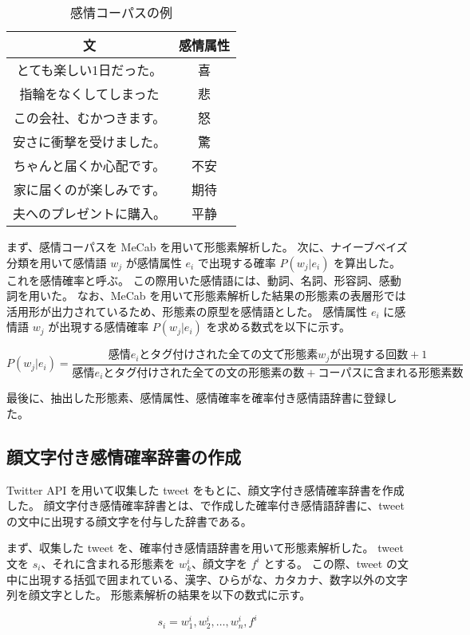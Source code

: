 \documentclass[11pt,a4j]{jsarticle}
\begin{document}
\begin{table}[htb]
  \caption{感情コーパスの例}
  \centering
  \begin{tabular}{c|c} \hline
    文 & 感情属性 \\ \hline \hline
    とても楽しい1日だった。 & 喜 \\
    指輪をなくしてしまった & 悲 \\
    この会社、むかつきます。 & 怒 \\ 
    安さに衝撃を受けました。 & 驚 \\
    ちゃんと届くか心配です。 & 不安 \\
    家に届くのが楽しみです。 & 期待 \\
    夫へのプレゼントに購入。& 平静 \\ \hline
  \end{tabular}
\end{table}

まず、感情コーパスを MeCab を用いて形態素解析した。
次に、ナイーブベイズ分類を用いて感情語 $w_j$ が感情属性 $e_i$ で出現する確率 $P(w_j|e_i)$ を算出した。
これを感情確率と呼ぶ。
この際用いた感情語には、動詞、名詞、形容詞、感動詞を用いた。
なお、MeCab を用いて形態素解析した結果の形態素の表層形では活用形が出力されているため、形態素の原型を感情語とした。
感情属性 $e_i$ に感情語 $w_j$ が出現する感情確率 $P(w_j|e_i)$ を求める数式を以下に示す。

\[
P(w_j|e_i)=\frac{感情 e_i とタグ付けされた全ての文で形態素 w_j が出現する回数 +1}{感情 e_i とタグ付けされた全ての文の形態素の数 + コーパスに含まれる形態素数}
\]

最後に、抽出した形態素、感情属性、感情確率を確率付き感情語辞書に登録した。

  \subsection{顔文字付き感情確率辞書の作成}\label{sec:kaomojidic}
Twitter API を用いて収集した tweet をもとに、顔文字付き感情確率辞書を作成した。
顔文字付き感情確率辞書とは、で作成した確率付き感情語辞書に、tweet の文中に出現する顔文字を付与した辞書である。

まず、収集した tweet を、確率付き感情語辞書を用いて形態素解析した。
tweet 文を $s_i$、それに含まれる形態素を $w^i_k$、顔文字を $f^i$ とする。
この際、tweet の文中に出現する括弧で囲まれている、漢字、ひらがな、カタカナ、数字以外の文字列を顔文字とした。
形態素解析の結果を以下の数式に示す。

\[
s_i=w^i_1,w^i_2,\ldots,w_n^i,f^i
\]
\end{document}
